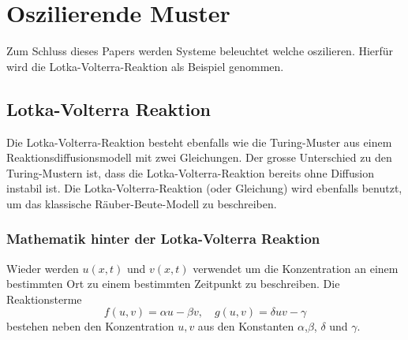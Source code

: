 %
%
%
%
\section{Oszilierende Muster
\label{reaktdiff:section:teil2}}
Zum Schluss dieses Papers werden Systeme beleuchtet welche oszilieren.
Hierfür wird die Lotka-Volterra-Reaktion als Beispiel genommen.


\subsection{Lotka-Volterra Reaktion 
\label{reaktdiff:subsection:bonorum}}

Die Lotka-Volterra-Reaktion\cite{Wikipedia_LotkaVolterra_2025}  besteht ebenfalls wie die Turing-Muster aus einem Reaktionsdiffusionsmodell mit zwei Gleichungen.
Der grosse Unterschied zu den Turing-Mustern ist, dass die Lotka-Volterra-Reaktion bereits ohne Diffusion instabil ist.
Die Lotka-Volterra-Reaktion (oder Gleichung) wird ebenfalls benutzt, um das klassische Räuber-Beute-Modell zu beschreiben.

\subsubsection{Mathematik hinter der Lotka-Volterra Reaktion}

Wieder werden \(u(x,t)\) und \(v(x,t)\) verwendet um die Konzentration an einem bestimmten Ort zu einem bestimmten Zeitpunkt zu beschreiben.
Die Reaktionsterme
\begin{equation}
     f(u,v) = \alpha u -  \beta v, \quad g(u,v)= \delta uv - \gamma
\end{equation}
bestehen neben den Konzentration \(u,v\) aus den Konstanten \(\alpha\),\(\beta\), \(\delta\) und \(\gamma\).

